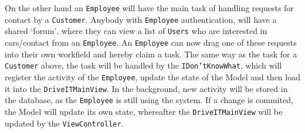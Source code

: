 On the other hand an \texttt{Employee} will have the main task of handling requests for contact by a \texttt{Customer}. Anybody with \texttt{Employee} authentication, will have a shared `forum', where they can view a list of \texttt{Users} who are interested in cars/contact from an \texttt{Employee}. An \texttt{Employee} can now drag one of these requests into their own workfield and hereby claim a task. The same way as the task for a \texttt{Customer} above, the task will be  handled by the \texttt{IDon'tKnowWhat}, which will register the activity of the \texttt{Employee}, update the state of the Model and then load it into the \texttt{DriveITMainView}. In the background, new activity will be stored in the database, as the \texttt{Employee} is still using the system. If a change is commited, the Model will update its own state, whereafter the \texttt{DriveITMainView} will be updated by the  \texttt{ViewController}.\\